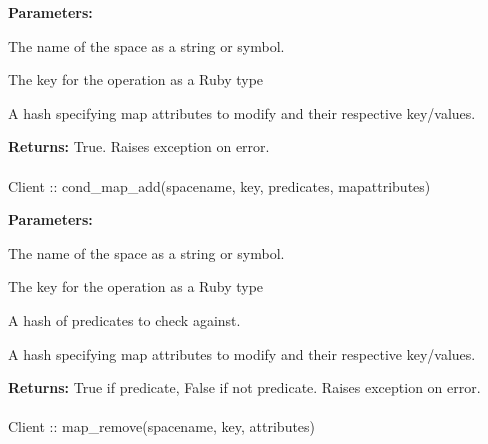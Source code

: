 \noindent\textbf{Parameters:}
\begin{description}[labelindent=\widthof{{\code{mapattributes}}},leftmargin=*,noitemsep,nolistsep,align=right]
\item[\code{spacename}] The name of the space as a string or symbol.
\item[\code{key}] The key for the operation as a Ruby type
\item[\code{mapattributes}] A hash specifying map attributes to modify and their respective key/values.
\end{description}

\noindent\textbf{Returns:}
True.  Raises exception on error.

\paragraph{}
\label{api:ruby:cond_map_add}
\begin{ccode}
Client :: cond_map_add(spacename, key, predicates, mapattributes)
\end{ccode}
\funcdesc 

\noindent\textbf{Parameters:}
\begin{description}[labelindent=\widthof{{\code{mapattributes}}},leftmargin=*,noitemsep,nolistsep,align=right]
\item[\code{spacename}] The name of the space as a string or symbol.
\item[\code{key}] The key for the operation as a Ruby type
\item[\code{predicates}] A hash of predicates to check against.
\item[\code{mapattributes}] A hash specifying map attributes to modify and their respective key/values.
\end{description}

\noindent\textbf{Returns:}
True if predicate, False if not predicate.  Raises exception on error.

\paragraph{}
\label{api:ruby:map_remove}
\begin{ccode}
Client :: map_remove(spacename, key, attributes)
\end{ccode}
\funcdesc 

